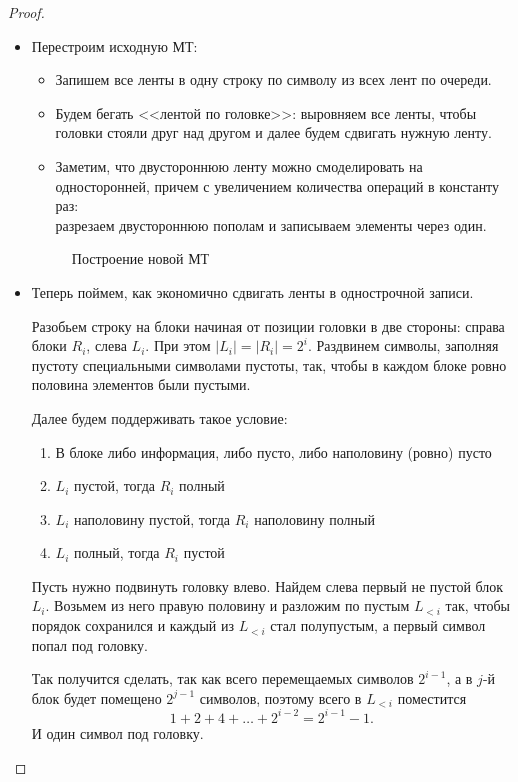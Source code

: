 \begin{proof}
	\begin{itemize}
		\item
			Перестроим исходную МТ:
			\begin{itemize}
				\item Запишем все ленты в одну строку  по символу из всех лент по очереди.
				\item  Будем бегать <<лентой по головке>>: выровняем все ленты, чтобы головки стояли друг над  другом и далее будем сдвигать нужную ленту.
				\item Заметим, что двустороннюю ленту можно смоделировать на односторонней, причем
				с увеличением количества операций в константу раз: \\
				разрезаем двустороннюю пополам и записываем элементы через один.
			\end{itemize}
			\begin{figure}[ht]
				\centering
				\caption{Построение новой МТ}
				\label{fig:two-bands}
			\end{figure}
		\item
			Теперь поймем, как экономично сдвигать ленты в однострочной записи.

			Разобьем строку на блоки начиная от позиции головки в две стороны: справа блоки $ R_i$, слева $ L_i$. При этом $ \lvert L_i \rvert = \lvert R_i \rvert  = 2^{i}$. Раздвинем символы, заполняя пустоту специальными символами пустоты, так, чтобы в каждом блоке ровно половина элементов были пустыми.

			Далее будем поддерживать такое условие:
			\begin{enumerate}[noitemsep]
				\item В блоке либо информация, либо пусто, либо наполовину (ровно) пусто
				\item $ L_i$ пустой, тогда  $ R_i$ полный
				\item  $ L_i$ наполовину пустой, тогда $ R_i$ наполовину полный
				\item $ L_i$ полный, тогда $ R_i$ пустой
			\end{enumerate}

			Пусть нужно подвинуть головку влево. Найдем слева первый не пустой блок $ L_i$. Возьмем из него правую половину и разложим по пустым $ L_{<i}$ так, чтобы порядок сохранился и каждый из $ L_{<i}$ стал полупустым, а первый символ попал под головку.

			Так получится сделать, так как всего перемещаемых символов $ 2^{i-1}$, а в $ j$-й блок будет помещено $ 2^{j-1}$ символов, поэтому всего в $ L_{<i}$ поместится
			\[
				1 + 2 + 4 + \ldots + 2^{i-2} = 2^{i-1} - 1
			.\]
			И один символ под головку.


\end{itemize}
\end{proof}
